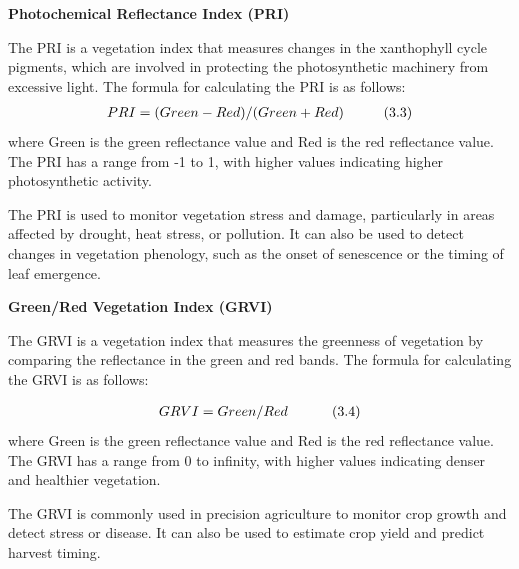 \documentclass{article}
\begin{document}
{                \textbf{Photochemical Reflectance Index (PRI)}
                \vspace*{1\baselineskip}  
                
                \hspace{0.5cm}The PRI is a vegetation index that measures changes in the xanthophyll cycle pigments, which are involved in protecting the photosynthetic machinery from excessive light. The formula for calculating the PRI is as follows:
                \begin{align*}
                    PRI = (Green - Red) / (Green + Red) \text{\hspace{1cm}(3.3)} 
                \end{align*}
                \vspace*{1\baselineskip}
                where Green is the green reflectance value and Red is the red reflectance value. The PRI has a range from -1 to 1, with higher values indicating higher photosynthetic activity.\par
                The PRI is used to monitor vegetation stress and damage, particularly in areas affected by drought, heat stress, or pollution. It can also be used to detect changes in vegetation phenology, such as the onset of senescence or the timing of leaf emergence.\par
                \vspace*{1\baselineskip}  
                
                \textbf{Green/Red Vegetation Index (GRVI)}
                \vspace*{1\baselineskip}  
                
                \hspace{0.5cm}The GRVI is a vegetation index that measures the greenness of vegetation by comparing the reflectance in the green and red bands. The formula for calculating the GRVI is as follows:\par
                \begin{align*}
                    GRVI = Green / Red\ \text{\hspace{1cm}(3.4)} 
                \end{align*}
                \vspace*{1\baselineskip}
                where Green is the green reflectance value and Red is the red reflectance value. The GRVI has a range from 0 to infinity, with higher values indicating denser and healthier vegetation.\par
                The GRVI is commonly used in precision agriculture to monitor crop growth and detect stress or disease. It can also be used to estimate crop yield and predict harvest timing.\par
                \vspace*{1\baselineskip}  
                
}
\end{document}
